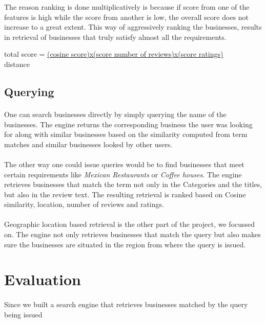 \documentclass[paper=letter, fontsize=15pt]{article} %
\begin{document}
The reason ranking is done multiplicatively is because if score from one of the features is high while the score from another is low, the overall score does not increase to a great extent. This way of aggressively ranking the businesses, results in retrieval of businesses that truly satisfy almost all the requirements. 
\begin{center}
total score = \underline{(cosine score)x(score number of reviews)x(score ratings)}
                             \\  distance

\end{center}
\subsection{Querying}
\paragraph{}One can search businesses directly by simply querying the name of the businesses. The engine returns the corresponding business the user was looking for along with similar businesses based on the similarity computed from term matches and similar businesses looked by other users. 
\paragraph{}The other way one could issue queries would be to find businesses that meet certain requirements like \textit{Mexican Restaurants} or \textit{Coffee houses}. The engine retrieves businesses that match the term not only in the Categories and the titles, but also in the review text. The resulting retrieval is ranked based on Cosine similarity, location, number of reviews and ratings.
\paragraph{}Geographic location based retrieval is the other part of the project, we focussed on. The engine not only retrieves businesses that match the query but also makes sure the businesses are situated in the region from where the query is issued. 
\section{Evaluation}
\paragraph{}Since we built a search engine that retrieves businesses matched by the query being issued
\end{document}

